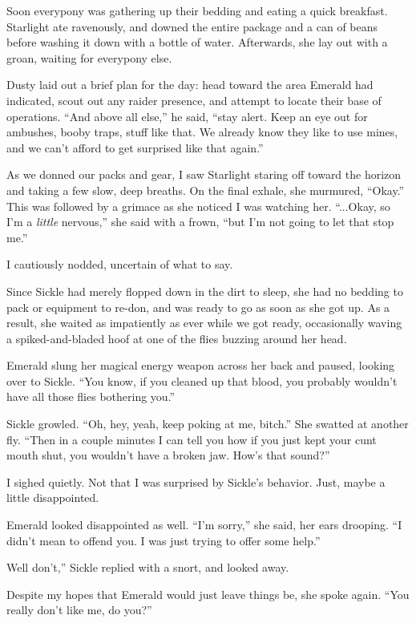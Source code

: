 Soon everypony was gathering up their bedding and eating a quick breakfast. Starlight ate ravenously, and downed the entire package and a can of beans before washing it down with a bottle of water. Afterwards, she lay out with a groan, waiting for everypony else.

Dusty laid out a brief plan for the day: head toward the area Emerald had indicated, scout out any raider presence, and attempt to locate their base of operations. “And above all else,” he said, “stay alert. Keep an eye out for ambushes, booby traps, stuff like that. We already know they like to use mines, and we can’t afford to get surprised like that again.”

As we donned our packs and gear, I saw Starlight staring off toward the horizon and taking a few slow, deep breaths. On the final exhale, she murmured, “Okay.” This was followed by a grimace as she noticed I was watching her. “...Okay, so I’m a \textit{little} nervous,” she said with a frown, “but I’m not going to let that stop me.”

I cautiously nodded, uncertain of what to say.

Since Sickle had merely flopped down in the dirt to sleep, she had no bedding to pack or equipment to re-don, and was ready to go as soon as she got up. As a result, she waited as impatiently as ever while we got ready, occasionally waving a spiked-and-bladed hoof at one of the flies buzzing around her head.

Emerald slung her magical energy weapon across her back and paused, looking over to Sickle. “You know, if you cleaned up that blood, you probably wouldn’t have all those flies bothering you.”

Sickle growled. “Oh, hey, yeah, keep poking at me, bitch.” She swatted at another fly. “Then in a couple minutes I can tell you how if you just kept your cunt mouth shut, you wouldn’t have a broken jaw. How’s that sound?”

I sighed quietly. Not that I was surprised by Sickle’s behavior. Just, maybe a little disappointed.

Emerald looked disappointed as well. “I’m sorry,” she said, her ears drooping. “I didn’t mean to offend you. I was just trying to offer some help.”

\leavevmode{}Well don’t,” Sickle replied with a snort, and looked away.

Despite my hopes that Emerald would just leave things be, she spoke again. “You really don’t like me, do you?”

